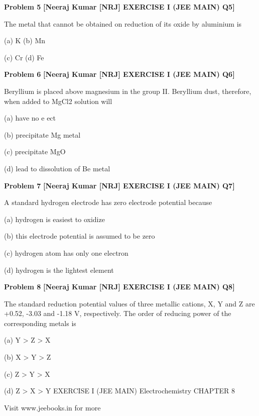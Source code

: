 \begin{problembox}
\textbf{Problem 5} \hfill \textbf{[Neeraj Kumar [NRJ] EXERCISE I (JEE MAIN) Q5]}
\label{q:ext-nrj_all_questions-5}

The metal that cannot be obtained on reduction 
of its oxide by aluminium is
 
 (a) K 
(b) Mn
 
 (c) Cr 
(d) Fe
\end{problembox}

\begin{problembox}
\textbf{Problem 6} \hfill \textbf{[Neeraj Kumar [NRJ] EXERCISE I (JEE MAIN) Q6]}
\label{q:ext-nrj_all_questions-6}

Beryllium is placed above magnesium in the group 
II. Beryllium dust, therefore, when added to 
MgCl2 solution will
 
 (a) have no e  ect
 
 (b) precipitate Mg metal
 
 (c) precipitate MgO
 
 (d) lead to dissolution of Be metal
\end{problembox}

\begin{problembox}
\textbf{Problem 7} \hfill \textbf{[Neeraj Kumar [NRJ] EXERCISE I (JEE MAIN) Q7]}
\label{q:ext-nrj_all_questions-7}

A standard hydrogen electrode has zero electrode 
potential because
 
 (a) hydrogen is easiest to oxidize
 
 (b)  this electrode potential is assumed to be zero
 
 (c) hydrogen atom has only one electron
 
 (d) hydrogen is the lightest element
\end{problembox}

\begin{problembox}
\textbf{Problem 8} \hfill \textbf{[Neeraj Kumar [NRJ] EXERCISE I (JEE MAIN) Q8]}
\label{q:ext-nrj_all_questions-8}

The standard reduction potential values of three 
metallic cations, X, Y and Z are +0.52, -3.03 and 
-1.18 V, respectively. The order of reducing power 
of the  corresponding metals is
 
 (a) Y > Z > X
 
 (b) X > Y > Z
 
 (c) Z > Y > X
 
 (d) Z > X > Y
EXERCISE I (JEE MAIN)
Electrochemistry
CHAPTER
8
 
 
Visit www.jeebooks.in for more
\end{problembox}

